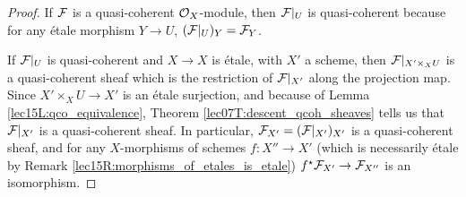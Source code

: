  \begin{proof}
    If $\mathcal{F}$ is a quasi-coherent $\mathcal{O}_X$-module, then $\mathcal{F}|_U$ is quasi-coherent because for
    any \'etale morphism $Y\to U$, $(\mathcal{F}|_U)_Y = \mathcal{F}_Y$.

    If $\mathcal{F}|_U$ is quasi-coherent and $X\to X$ is \'etale, with $X'$ a scheme, then
    $\mathcal{F}|_{X'\times_X U}$ is a quasi-coherent sheaf which
    is the restriction of $\mathcal{F}|_{X'}$ along the projection map. Since $X'\times_X U\to X'$
    is an \'etale surjection, and because of Lemma \ref{lec15L:qco_equivalence}, Theorem
    \ref{lec07T:descent_qcoh_sheaves} tells us that $\mathcal{F}|_{X'}$ is a quasi-coherent
    sheaf. In particular, $\mathcal{F}_{X'}=(\mathcal{F}|_{X'})_{X'}$ is a quasi-coherent sheaf, and for
    any $X$-morphisms of schemes $f:X''\to X'$ (which is necessarily \'etale by Remark
    \ref{lec15R:morphisms_of_etales_is_etale}) $f^\star\mathcal{F}_{X'}\to \mathcal{F}_{X''}$ is an
    isomorphism.
 \end{proof}

